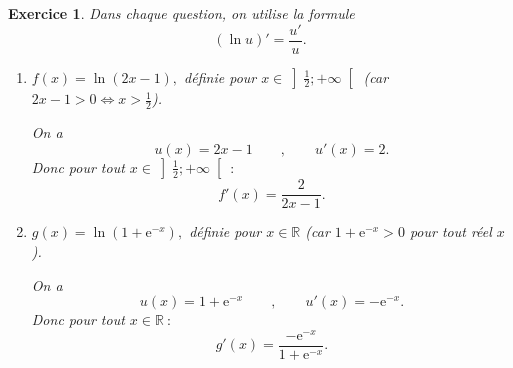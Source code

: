 \documentclass[10pt]{article}
\newtheorem{exo}{Exercice}
\begin{document}
\begin{exo}

Dans chaque question, on utilise la formule 
\[(\ln u)'=\frac{u'}{u}.\]

\begin{enumerate}
\item $f(x)=\ln(2x-1),$ définie pour $x\in\left]\frac{1}{2};+\infty\right[$ (car $2x-1>0\iff x>\frac{1}{2}$).
\medskip

On a \[u(x)=2x-1\qquad ,\qquad u'(x)=2.\] Donc pour tout $x\in \left]\frac{1}{2};+\infty\right[~:$
\[f'(x)=\frac{2}{2x-1}.\]
\item $g(x)=\ln\left(1+\text{e}^{-x}\right),$ définie pour $x\in\mathbb{R}$ (car $1+\text{e}^{-x}>0$ pour tout réel $x$).

\medskip

On a \[u(x)=1+\text{e}^{-x}\qquad ,\qquad u'(x)=-\text{e}^{-x}.\] Donc pour tout $x\in \mathbb{R}~:$
\[g'(x)=\frac{-\text{e}^{-x}}{1+\text{e}^{-x}}.\]
\end{enumerate}


\end{exo}
\end{document}
